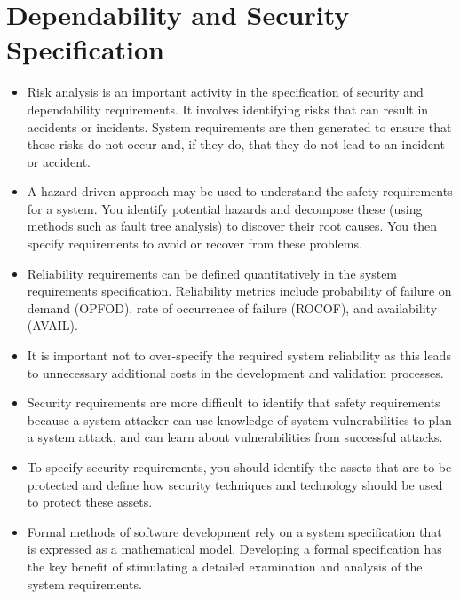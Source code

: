 \documentclass{article}
\begin{document}
\section{Dependability and Security Specification}
\begin{itemize}
    \item Risk analysis is an important activity in the specification of security and dependability requirements.  It involves identifying risks that can result in accidents or incidents.
        System requirements are then generated to ensure that these risks do not occur and, if they do, that they do not lead to an incident or accident.
    \item A hazard-driven approach may be used to understand the safety requirements for a system.  You identify potential hazards and decompose these (using methods such as fault tree analysis) to discover their root causes.  
        You then specify requirements to avoid or recover from these problems.
    \item Reliability requirements can be defined quantitatively in the system requirements specification.
        Reliability metrics include probability of failure on demand (OPFOD), rate of occurrence of failure (ROCOF), and availability (AVAIL).
    \item It is important not to over-specify the required system reliability as this leads to unnecessary additional costs in the development and validation processes.
    \item Security requirements are more difficult to identify that safety requirements because a system attacker can use knowledge of system vulnerabilities to plan a system attack, and can learn about vulnerabilities from successful attacks.
    \item To specify security requirements, you should identify the assets that are to be protected and define how security techniques and technology should be used to protect these assets.
    \item Formal methods of software development rely on a system specification that is expressed as a mathematical model.  
        Developing a formal specification has the key benefit of stimulating a detailed examination and analysis of the system requirements.
\end{itemize}
\end{document}
